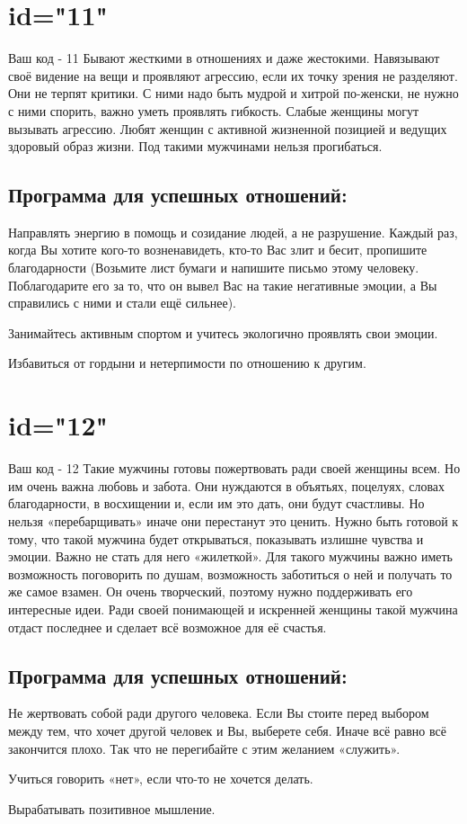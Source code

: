 \section{id="11"}{Ваш код - 11}
Бывают жесткими в отношениях и даже жестокими. Навязывают своё 
видение на вещи и проявляют агрессию, если их точку зрения не 
разделяют. Они не терпят критики. С ними надо быть мудрой и хитрой 
по-женски, не нужно с ними спорить, важно уметь проявлять гибкость. 
Слабые женщины могут вызывать агрессию. Любят женщин с активной 
жизненной позицией и ведущих здоровый образ жизни. Под такими 
мужчинами нельзя прогибаться.
\subsection{Программа для успешных отношений:}
\item Направлять энергию в помощь и созидание людей, а не разрушение. 
Каждый раз, когда Вы хотите кого-то возненавидеть, кто-то Вас злит 
и бесит, пропишите благодарности (Возьмите лист бумаги и напишите 
письмо этому человеку. Поблагодарите его за то, что он вывел Вас на 
такие негативные эмоции, а Вы справились с ними и стали ещё сильнее).
\item Занимайтесь активным спортом и учитесь экологично проявлять 
свои эмоции.
\item Избавиться от гордыни и нетерпимости по отношению к другим.
\endsubsection
\endsection

\section{id="12"}{Ваш код - 12}
Такие мужчины готовы пожертвовать ради своей женщины всем. Но им 
очень важна любовь и забота. Они нуждаются в объятьях, поцелуях, 
словах благодарности, в восхищении и, если им это дать, они будут 
счастливы. Но нельзя «перебарщивать» иначе они перестанут это ценить. 
Нужно быть готовой к тому, что такой мужчина будет открываться, 
показывать излишне чувства и эмоции. Важно не стать для него 
«жилеткой». Для такого мужчины важно иметь возможность поговорить 
по душам, возможность заботиться о ней и получать то же самое 
взамен. Он очень творческий, поэтому нужно поддерживать его 
интересные идеи. Ради своей понимающей и искренней женщины такой 
мужчина отдаст последнее и сделает всё возможное для её счастья.
\subsection{Программа для успешных отношений:}
\item Не жертвовать собой ради другого человека. Если Вы стоите 
перед выбором между тем, что хочет другой человек и Вы, выберете 
себя. Иначе всё равно всё закончится плохо. Так что не перегибайте 
с этим желанием «служить».
\item Учиться говорить «нет», если что-то не хочется делать.
\item Вырабатывать позитивное мышление.
\endsubsection
\endsection

